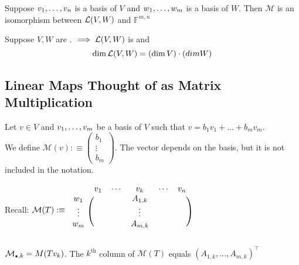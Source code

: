   \begin{thm}
    Suppose $v_1, \dots, v_n$ is a basis of $V$ and $w_1, \dots, w_m$ is a basis of $W$. Then $\mathcal{M}$ is an isomorphism between ${\mathcal{L}(V,W)}$ and $\mathbb{F}^{m,n}$
  \end{thm}

  \begin{thm}
    Suppose $V,W$ are \fd. $\implies {\mathcal{L}(V,W)}$ is \fd and
    \begin{equation}
      \dim {\mathcal{L}(V,W)} = (\dim V)\cdot(dim W)
    \end{equation}
  \end{thm}

  \subsection{Linear Maps Thought of as Matrix Multiplication}

  \begin{mydef}
    Let $v \in V$ and $v_1, \dots, v_m$ be a basis of $V$ such that $v=b_1v_1+\dots+b_mv_m$.
    \\
    We define
    $
    \mathcal{M}(v) :\equiv
    \left (
    \begin{matrix}
      b_1 \\ \vdots \\ b_m
    \end{matrix}
    \right )
    $. The vector depends on the basis, but it is not included in the notation.
  \end{mydef}

  Recall: $
  \mathcal{M} (T) :\equiv
  \begin{blockarray}{cccc}
    & v_1 \quad \cdots & v_k & \cdots \quad v_n \\
    \begin{block}{c(ccc)}
      w_1    & & A_{1,k} & \\
      \vdots & & \vdots & \\
      w_m    & & A_{m,k} & \\
    \end{block}
  \end{blockarray}
  $


  \setcounter{thm}{74}
  \begin{thm}
    $\mathcal{M}_{\mathsmaller{\bullet}, k} = M(T v_k)$. The $k^{\text{th}}$ column of $\mathcal{M}(T)$ equals $(A_{1,k}, \dots, A_{m,k})^\top$
  \end{thm}

